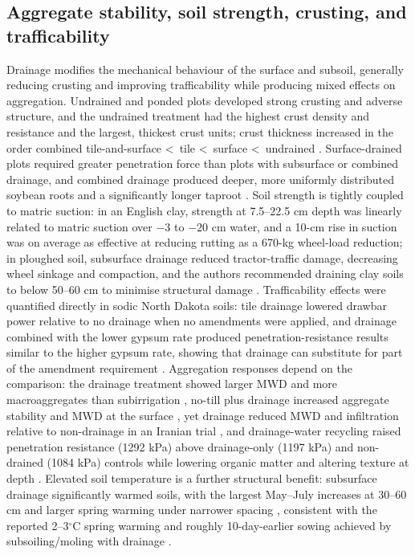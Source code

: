 \subsection{Aggregate stability, soil strength, crusting, and trafficability}

Drainage modifies the mechanical behaviour of the surface and subsoil, generally
reducing crusting and improving trafficability while producing mixed effects on
aggregation. Undrained and ponded plots developed strong crusting and adverse
structure, and the undrained treatment had the highest crust density and resistance
and the largest, thickest crust units; crust thickness increased in the order combined
tile-and-surface \textless\ tile \textless\ surface \textless\ undrained
\parencite{HUNDAL1976,FAUSEY1969}. Surface-drained plots required greater penetration
force than plots with subsurface or combined drainage, and combined drainage produced
deeper, more uniformly distributed soybean roots and a significantly longer taproot
\parencite{FAUSEY1969}. Soil strength is tightly coupled to matric suction: in an
English clay, strength at 7.5--22.5 cm depth was linearly related to matric suction
over $-3$ to $-20$ cm water, and a 10-cm rise in suction was on average as effective
at reducing rutting as a 670-kg wheel-load reduction; in ploughed soil, subsurface
drainage reduced tractor-traffic damage, decreasing wheel sinkage and compaction, and
the authors recommended draining clay soils to below 50--60 cm to minimise structural
damage \parencite{STEINHARDT1974}. Trafficability effects were quantified directly in
sodic North Dakota soils: tile drainage lowered drawbar power relative to no drainage
when no amendments were applied, and drainage combined with the lower gypsum rate
produced penetration-resistance results similar to the higher gypsum rate, showing
that drainage can substitute for part of the amendment requirement
\parencite{Wamono2016,Wamono2016b}. Aggregation responses depend on the comparison:
the drainage treatment showed larger MWD and more macroaggregates than subirrigation
\parencite{Baker2004}, no-till plus drainage increased aggregate stability and MWD at
the surface \parencite{Kumar2014}, yet drainage reduced MWD and infiltration relative
to non-drainage in an Iranian trial \parencite{Shabanpour2022}, and drainage-water
recycling raised penetration resistance (1292 kPa) above drainage-only (1197 kPa) and
non-drained (1084 kPa) controls while lowering organic matter and altering texture at
depth \parencite{Kaur2023}. Elevated soil temperature is a further structural benefit:
subsurface drainage significantly warmed soils, with the largest May--July increases
at 30--60 cm and larger spring warming under narrower spacing
\parencite{Jin2008}, consistent with the reported 2--3$^{\circ}$C spring warming and
roughly 10-day-earlier sowing achieved by subsoiling/moling with drainage
\parencite{PLAMENAC1988}.

